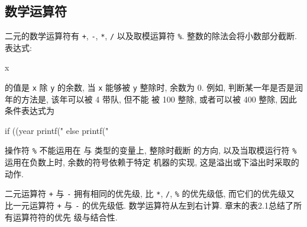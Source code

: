 \subsection{数学运算符}
二元的数学运算符有 \verb"+", \verb"-", \verb"*", \verb"/" 以及取模运算符
\verb"%". 整数的除法会将小数部分截断. 表达式:
\begin{myverbatim}
    x %
\end{myverbatim}
的值是 \verb"x" 除 \verb"y" 的余数, 当 \verb"x" 能够被 \verb"y" 整除时,
余数为 0. 例如, 判断某一年是否是润年的方法是, 该年可以被 4 带队, 但不能
被 100 整除, 或者可以被 400 整除, 因此条件表达式为
\begin{myverbatim}
    if ((year %
        printf("%
    else 
        printf("%
\end{myverbatim}
操作符 \verb"%" 不能运用在 \cfloat 与 \cdouble 类型的变量上, 整除时截断
的方向, 以及当取模运行符 \verb"%" 运用在负数上时, 余数的符号依赖于特定
机器的实现, 这是溢出或下溢出时采取的动作.

二元运算符 \verb"+" 与 \verb"-" 拥有相同的优先级, 比 \verb"*", \verb"/",
\verb"%" 的优先级低, 而它们的优先级又比一元运算符 \verb"+" 与 \verb"-"
的优先级低. 数学运算符从左到右计算. 章末的表2.1总结了所有运算符符的优先
级与结合性.
